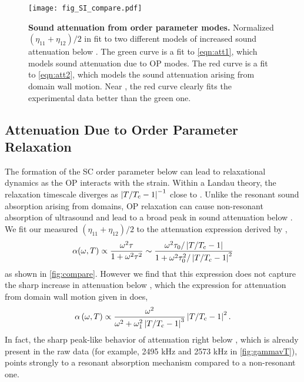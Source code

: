 	\begin{figure*}
		\centering
		\texttt{[image: fig\_SI\_compare.pdf]}
		\caption{\textbf{Sound attenuation from order parameter modes.} Normalized $(\eta_{11}+\eta_{12})/2$ in \sro fit to two different models of increased sound attenuation below \Tc. The green curve is a fit to \autoref{eqn:att1}, which models sound attenuation due to OP modes. The red curve is a fit to \autoref{eqn:att2}, which models the sound attenuation arising from domain wall motion. Near \Tc, the red curve clearly fits the experimental data better than the green one.}
		\label{fig:compare}
	\end{figure*} 
	
	\subsection*{Attenuation Due to Order Parameter Relaxation}
	
	The formation of the SC order parameter below \Tc can lead to relaxational dynamics as the OP interacts with the strain. Within a Landau theory, the relaxation timescale diverges as $\left|T/T_{\rm c}-1\right|^{-1}$ close to \Tc. Unlike the resonant sound absorption arising from domains, OP relaxation can cause non-resonant absorption of ultrasound and lead to a broad peak in sound attenuation below \Tc \cite{SigristPTP2002}. We fit our measured $(\eta_{11}+\eta_{12})/2$ to the attenuation expression derived by \citet{SigristPTP2002},
	\begin{equation}
	\alpha(\omega,T)\propto \frac{\omega^2\tau}{1+\omega^2\tau^2} \sim \frac{\omega^2\tau_0/\left|T/T_{\rm c}-1\right|}{1+\omega^2\tau_0^2/\left|T/T_{\rm c}-1\right|^2}
	\label{eqn:att1}
	\end{equation}
	as shown in \autoref{fig:compare}. However we find that this expression does not capture the sharp increase in attenuation below \Tc, which the expression for attenuation from domain wall motion given in \citet{SigristRMP1991} does, 
	\begin{equation}
	\alpha\left(\omega,T\right) \propto \frac{\omega^2}{\omega^2+\omega_1^2\left|T/T_{\rm c}-1\right|^3}\left|T/T_{\rm c}-1\right|^2.
	\label{eqn:att2}
	\end{equation}
	In fact, the sharp peak-like behavior of attenuation right below \Tc, which is already present in the raw data (for example, 2495 kHz and 2573 kHz in \autoref{fig:gammavT}), points strongly to a resonant absorption mechanism compared to a non-resonant one.
	